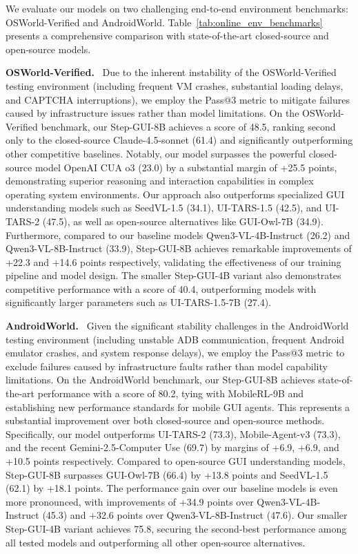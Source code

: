 We evaluate our models on two challenging end-to-end environment benchmarks: OSWorld-Verified and AndroidWorld. Table~\ref{tab:online_env_benchmarks} presents a comprehensive comparison with state-of-the-art closed-source and open-source models.

\textbf{OSWorld-Verified.}~\cite{xie2024osworld} 
Due to the inherent instability of the OSWorld-Verified testing environment (including frequent VM crashes, substantial loading delays, and CAPTCHA interruptions), we employ the Pass@3 metric to mitigate failures caused by infrastructure issues rather than model limitations. 
On the OSWorld-Verified benchmark, our Step-GUI-8B achieves a score of 48.5, ranking second only to the closed-source Claude-4.5-sonnet (61.4) and significantly outperforming other competitive baselines. Notably, our model surpasses the powerful closed-source model OpenAI CUA o3 (23.0) by a substantial margin of +25.5 points, demonstrating superior reasoning and interaction capabilities in complex operating system environments. Our approach also outperforms specialized GUI understanding models such as SeedVL-1.5 (34.1), UI-TARS-1.5 (42.5), and UI-TARS-2 (47.5), as well as open-source alternatives like GUI-Owl-7B (34.9). Furthermore, compared to our baseline models Qwen3-VL-4B-Instruct (26.2) and Qwen3-VL-8B-Instruct (33.9), Step-GUI-8B achieves remarkable improvements of +22.3 and +14.6 points respectively, validating the effectiveness of our training pipeline and model design. The smaller Step-GUI-4B variant also demonstrates competitive performance with a score of 40.4, outperforming models with significantly larger parameters such as UI-TARS-1.5-7B (27.4).

\textbf{AndroidWorld.}~\cite{rawles2024androidworld} 
Given the significant stability challenges in the AndroidWorld testing environment (including unstable ADB communication, frequent Android emulator crashes, and system response delays), we employ the Pass@3 metric to exclude failures caused by infrastructure faults rather than model capability limitations. 
On the AndroidWorld benchmark, our Step-GUI-8B achieves state-of-the-art performance with a score of 80.2, tying with MobileRL-9B and establishing new performance standards for mobile GUI agents. This represents a substantial improvement over both closed-source and open-source methods. Specifically, our model outperforms UI-TARS-2 (73.3), Mobile-Agent-v3 (73.3), and the recent Gemini-2.5-Computer Use (69.7) by margins of +6.9, +6.9, and +10.5 points respectively. Compared to open-source GUI understanding models, Step-GUI-8B surpasses GUI-Owl-7B (66.4) by +13.8 points and SeedVL-1.5 (62.1) by +18.1 points. The performance gain over our baseline models is even more pronounced, with improvements of +34.9 points over Qwen3-VL-4B-Instruct (45.3) and +32.6 points over Qwen3-VL-8B-Instruct (47.6). Our smaller Step-GUI-4B variant achieves 75.8, securing the second-best performance among all tested models and outperforming all other open-source alternatives.

